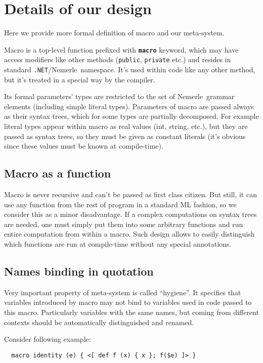 \documentclass{llncs}
\newcommand{\net}[0]{{\tt .NET}}
\newcommand{\nem}[0]{Nemerle}
\newcommand{\kw}[1]{{\tt \bf #1}}
\begin{document}
\section{Details of our design}
Here we provide more formal definition of macro and our meta-system.

Macro is a top-level function prefixed with \kw{macro} keyword, which may 
have access modifiers like other methods (\verb,public,, \verb,private, etc.) 
and resides in standard \net/\nem\ namespace. It's used within code like
any other method, but it's treated in a special way by the compiler.

Its formal parameters' types are restricted to the set of \nem\
grammar elements (including simple literal types). Parameters of 
macro are passed always as their syntax trees, which for some
types are partially decomposed. For example literal types appear
within macro as real values (int, string, etc.), but they are passed
as syntax trees, so they must be given as constant literals (it's
obvious since these values must be known at compile-time).

\subsection{Macro as a function}
Macro is never recursive and can't be passed as first class citizen.
But still, it can use any function from the rest of program in a standard ML
fashion, so we consider this as a minor disadvantage. If a complex 
computations on syntax trees are needed, one must simply put them 
into some arbitrary functions and run entire computation from within a macro. 
Such design allows to easily distinguish which functions are run at
compile-time without any special annotations.

\subsection{Names binding in quotation}
Very important property of meta-system is called ``hygiene''. It specifies that
variables introduced by macro may not bind to variables used in code passed
to this macro. Particularly variables with the same names, but coming from 
different contexts should be automatically distinguished and renamed.
 
Consider following example:

\begin{verbatim}
  macro identity (e) { <[ def f (x) { x }; f($e) ]> }
\end{verbatim} %
\end{document}
